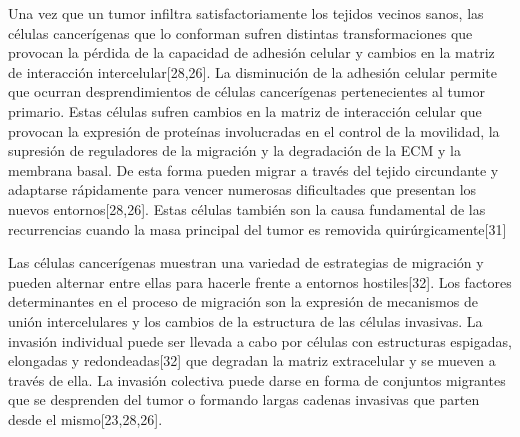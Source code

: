 \hspace{.1cm}Una vez que un tumor infiltra satisfactoriamente los tejidos vecinos sanos, las células cancerígenas que lo conforman sufren distintas transformaciones que provocan la pérdida de la capacidad de adhesión celular y cambios en la matriz de interacción intercelular[28,26]. La disminución de la adhesión celular permite que ocurran desprendimientos de células cancerígenas pertenecientes al tumor primario. Estas células sufren cambios en la matriz de interacción celular que provocan la expresión de proteínas involucradas en el control de la movilidad, la supresión de reguladores de la migración y la degradación de la ECM y la membrana basal. De esta forma pueden migrar a través del tejido circundante y adaptarse rápidamente para vencer numerosas dificultades que presentan los nuevos entornos[28,26]. Estas células también son la causa fundamental de las recurrencias cuando la masa principal del tumor es removida quirúrgicamente[31]

\hspace{.1cm}Las células cancerígenas muestran una variedad de estrategias de migración y pueden alternar entre ellas para hacerle frente a entornos hostiles[32]. Los factores determinantes en el proceso de migración son la expresión de mecanismos de unión intercelulares y los cambios de la estructura de las células invasivas. La invasión individual puede ser llevada a cabo por células con estructuras espigadas, elongadas y redondeadas[32] que degradan la matriz extracelular y se mueven a través de ella. La invasión colectiva puede darse en forma de conjuntos migrantes que se desprenden del tumor o formando largas cadenas invasivas que parten desde el mismo[23,28,26].

